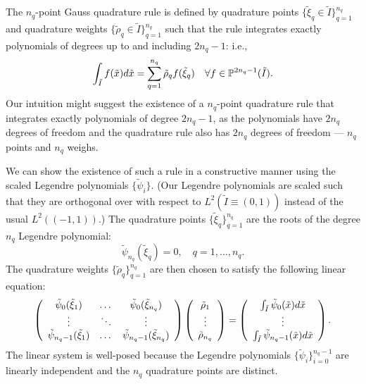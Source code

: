 The $n_q$-point Gauss quadrature rule is defined by quadrature points $\{\tilde \xi_q \in \tilde I \}_{q=1}^{n_q}$ and quadrature weights $\{ \tilde \rho_q \in \tilde I \}_{q=1}^{n_q}$ such that the rule integrates exactly polynomials of degrees up to and including $2n_q - 1$: i.e.,
\begin{equation}
  \int_{\tilde I} f(\tilde x) d\tilde x = \sum_{q=1}^{n_q} \tilde \rho_q f(\tilde \xi_q) \quad \forall f \in \PP^{2n_q-1}(\tilde I).
  \label{eq:fe_impl_gauss_cond}
\end{equation}
Our intuition might suggest the existence of a $n_q$-point quadrature rule that integrates exactly polynomials of degree $2n_q-1$, as the polynomials have $2n_q$ degrees of freedom and the quadrature rule also has $2n_q$ degrees of freedom --- $n_q$ points and $n_q$ weighs.


We can show the existence of such a rule in a constructive manner using the scaled Legendre polynomials $\{ \tilde \psi_i \}$. (Our Legendre polynomials are scaled such that they are orthogonal over with respect to $L^2(\tilde I \equiv (0,1))$ instead of the usual $L^2((-1,1))$.) The quadrature points $\{ \tilde \xi_q \}_{q=1}^{n_q}$ are the roots of the degree $n_q$ Legendre polynomial:
\begin{equation}
  \tilde \psi_{n_q}(\tilde \xi_q) = 0, \quad q = 1,\dots,n_q.
  \label{eq:fe_impl_gauss_points}
\end{equation}
The quadrature weights $\{\tilde \rho_q \}_{q=1}^{n_q}$ are then chosen to satisfy the following linear equation:
\begin{equation}
  \bmat{ccc}
  \tilde \psi_0(\tilde \xi_1) & \dots & \tilde \psi_0(\tilde \xi_{n_q}) \\
  \vdots & \ddots & \vdots \\
  \tilde \psi_{n_q-1}(\tilde \xi_1) & \dots & \tilde \psi_{n_q-1}(\tilde \xi_{n_q}) 
  \emat
  \bmat{c}
  \tilde \rho_1 \\ \vdots \\ \tilde \rho_{n_q}
  \emat
  =
  \bmat{c}
  \int_{\tilde I} \tilde \psi_0(\tilde x) d\tilde x \\
  \vdots \\
  \int_{\tilde I} \tilde \psi_{n_q-1}(\tilde x) d\tilde x
  \emat .
  \label{eq:fe_impl_gauss_weights}
\end{equation}
The linear system is well-posed because the Legendre polynomials $\{ \tilde \psi_i \}_{i=0}^{n_q-1}$ are linearly independent and the $n_q$ quadrature points are distinct.

